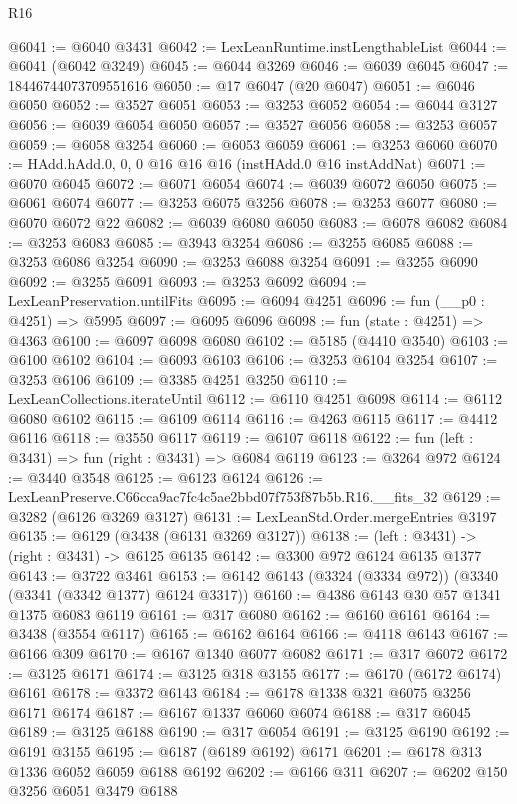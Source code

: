 \begin{lexlean}{R16}
\begin{coremodule}
@6041 := @6040 @3431
@6042 := LexLeanRuntime.instLengthableList
@6044 := @6041 (@6042 @3249)
@6045 := @6044 @3269
@6046 := @6039 @6045
@6047 := 18446744073709551616
@6050 := @17 @6047 (@20 @6047)
@6051 := @6046 @6050
@6052 := @3527 @6051
@6053 := @3253 @6052
@6054 := @6044 @3127
@6056 := @6039 @6054 @6050
@6057 := @3527 @6056
@6058 := @3253 @6057
@6059 := @6058 @3254
@6060 := @6053 @6059
@6061 := @3253 @6060
@6070 := HAdd.hAdd.{0, 0, 0} @16 @16 @16 (instHAdd.{0} @16 instAddNat)
@6071 := @6070 @6045
@6072 := @6071 @6054
@6074 := @6039 @6072 @6050
@6075 := @6061 @6074
@6077 := @3253 @6075 @3256
@6078 := @3253 @6077
@6080 := @6070 @6072 @22
@6082 := @6039 @6080 @6050
@6083 := @6078 @6082
@6084 := @3253 @6083
@6085 := @3943 @3254
@6086 := @3255 @6085
@6088 := @3253 @6086 @3254
@6090 := @3253 @6088 @3254
@6091 := @3255 @6090
@6092 := @3255 @6091
@6093 := @3253 @6092
@6094 := LexLeanPreservation.untilFits
@6095 := @6094 @4251
@6096 := fun (__p0 : @4251) => @5995
@6097 := @6095 @6096
@6098 := fun (state : @4251) => @4363
@6100 := @6097 @6098 @6080
@6102 := @5185 (@4410 @3540)
@6103 := @6100 @6102
@6104 := @6093 @6103
@6106 := @3253 @6104 @3254
@6107 := @3253 @6106
@6109 := @3385 @4251 @3250
@6110 := LexLeanCollections.iterateUntil
@6112 := @6110 @4251 @6098
@6114 := @6112 @6080 @6102
@6115 := @6109 @6114
@6116 := @4263 @6115
@6117 := @4412 @6116
@6118 := @3550 @6117
@6119 := @6107 @6118
@6122 := fun (left : @3431) => fun (right : @3431) => @6084 @6119
@6123 := @3264 @972
@6124 := @3440 @3548
@6125 := @6123 @6124
@6126 := LexLeanPreserve.C66cca9ac7fc4c5ae2bbd07f753f87b5b.R16.__fits_32
@6129 := @3282 (@6126 @3269 @3127)
@6131 := LexLeanStd.Order.mergeEntries @3197
@6135 := @6129 (@3438 (@6131 @3269 @3127))
@6138 := (left : @3431) -> (right : @3431) -> @6125 @6135
@6142 := @3300 @972 @6124 @6135 @1377
@6143 := @3722 @3461
@6153 := @6142 @6143 (@3324 (@3334 @972)) (@3340 (@3341 (@3342 @1377) @6124 @3317))
@6160 := @4386 @6143 @30 @57 @1341 @1375 @6083 @6119
@6161 := @317 @6080
@6162 := @6160 @6161
@6164 := @3438 (@3554 @6117)
@6165 := @6162 @6164
@6166 := @4118 @6143
@6167 := @6166 @309
@6170 := @6167 @1340 @6077 @6082
@6171 := @317 @6072
@6172 := @3125 @6171
@6174 := @3125 @318 @3155
@6177 := @6170 (@6172 @6174) @6161
@6178 := @3372 @6143
@6184 := @6178 @1338 @321 @6075 @3256 @6171 @6174
@6187 := @6167 @1337 @6060 @6074
@6188 := @317 @6045
@6189 := @3125 @6188
@6190 := @317 @6054
@6191 := @3125 @6190
@6192 := @6191 @3155
@6195 := @6187 (@6189 @6192) @6171
@6201 := @6178 @313 @1336 @6052 @6059 @6188 @6192
@6202 := @6166 @311
@6207 := @6202 @150 @3256 @6051 @3479 @6188

\end{coremodule}
\end{lexlean}
